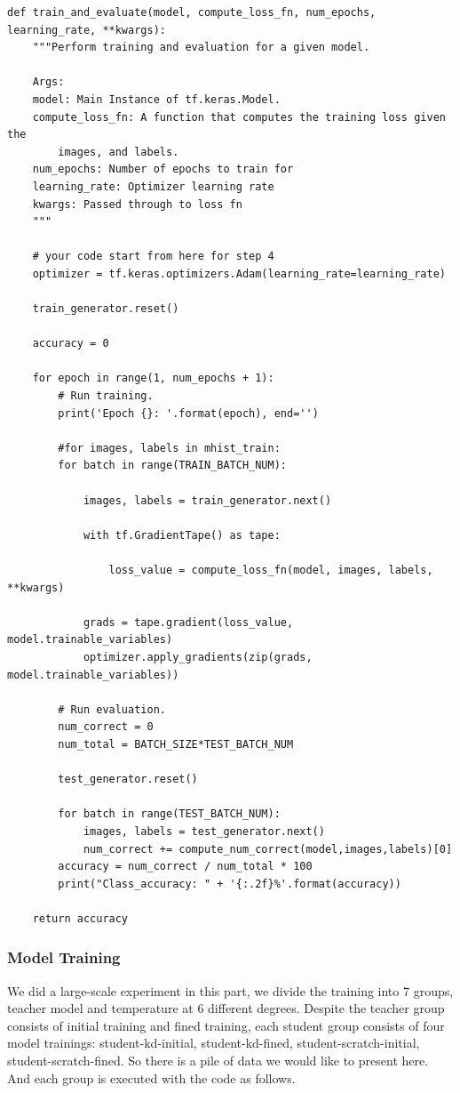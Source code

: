 \documentclass[conference]{IEEEtran}
\begin{document}
\begin{lstlisting}
def train_and_evaluate(model, compute_loss_fn, num_epochs, learning_rate, **kwargs):
    """Perform training and evaluation for a given model.

    Args:
    model: Main Instance of tf.keras.Model.
    compute_loss_fn: A function that computes the training loss given the
        images, and labels.
    num_epochs: Number of epochs to train for
    learning_rate: Optimizer learning rate
    kwargs: Passed through to loss fn
    """

    # your code start from here for step 4
    optimizer = tf.keras.optimizers.Adam(learning_rate=learning_rate)

    train_generator.reset()
    
    accuracy = 0
    
    for epoch in range(1, num_epochs + 1):
        # Run training.
        print('Epoch {}: '.format(epoch), end='')

        #for images, labels in mhist_train:
        for batch in range(TRAIN_BATCH_NUM):
            
            images, labels = train_generator.next()

            with tf.GradientTape() as tape:

                loss_value = compute_loss_fn(model, images, labels, **kwargs)

            grads = tape.gradient(loss_value, model.trainable_variables)
            optimizer.apply_gradients(zip(grads, model.trainable_variables))

        # Run evaluation.
        num_correct = 0
        num_total = BATCH_SIZE*TEST_BATCH_NUM
        
        test_generator.reset()
        
        for batch in range(TEST_BATCH_NUM):
            images, labels = test_generator.next()
            num_correct += compute_num_correct(model,images,labels)[0]
        accuracy = num_correct / num_total * 100
        print("Class_accuracy: " + '{:.2f}%'.format(accuracy))
    
    return accuracy
\end{lstlisting}

\subsubsection{Model Training}

We did a large-scale experiment in this part, we divide the training into 7 groups, teacher model and temperature at 6 different degrees. Despite the teacher group consists of initial training and fined training, each student group consists of four model trainings: student-kd-initial, student-kd-fined, student-scratch-initial, student-scratch-fined. So there is a pile of data we would like to present here. And each group is executed with the code as follows.
\end{document}
